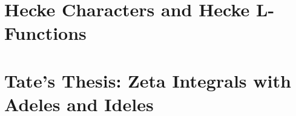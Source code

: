 

























\section{Hecke Characters and Hecke L-Functions}









\section{Tate's Thesis: Zeta Integrals with Adeles and Ideles}

